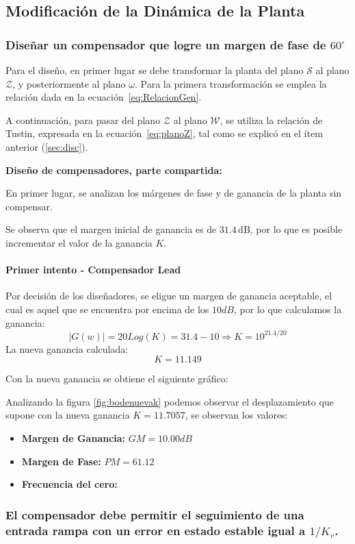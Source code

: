 \subsection{Modificación de la Dinámica de la Planta}
\subsubsection{Diseñar un compensador que logre un margen de fase de $60^\circ$} 

Para el diseño, en primer lugar se debe transformar la planta del plano $\mathcal{S}$ al plano $\mathcal{Z}$, y posteriormente al plano $\mathcal{\omega}$. Para la primera transformación se emplea la relación dada en la ecuación~\ref{eq:RelacionGen}.  

A continuación, para pasar del plano $\mathcal{Z}$ al plano $\mathcal{W}$, se utiliza la relación de Tustin, expresada en la ecuación~\ref{eq:planoZ}, tal como se explicó en el ítem anterior (\ref{sec:disc}).

\textbf{Diseño de compensadores, parte compartida:}

En primer lugar, se analizan los márgenes de fase y de ganancia de la planta sin compensar.


Se observa que el margen inicial de ganancia es de $31.4\,\text{dB}$, por lo que es posible incrementar el valor de la ganancia $K$.

\paragraph{Primer intento - Compensador Lead}
Por decisi\'on de los diseñadores, se eligue un margen de ganancia aceptable, el cual es aquel que se encuentra por encima de los $10dB$, por lo que calculamos la ganancia:
\[
	|G(w)|=20Log(K) = 31.4-10 \Rightarrow K = 10^{21.4/20}
\]
La nueva ganancia calculada:
\[
	K = 11.149
\]

Con la nueva ganancia se obtiene el siguiente gr\'afico:

Analizando la figura \ref{fig:bodenuevak} podemos observar el desplazamiento que supone con la nueva ganancia $K = 11.7057$, se observan los valores:
\begin{itemize}
	\item \textbf{Margen de Ganancia:} $GM = 10.00 dB$
	\item \textbf{Margen de Fase:} $PM = 61.12$
	\item \textbf{Frecuencia del cero:} $$
\end{itemize}

\subsubsection{El compensador debe permitir el seguimiento de una entrada rampa con un error en estado estable igual a $1/K_v$.}
